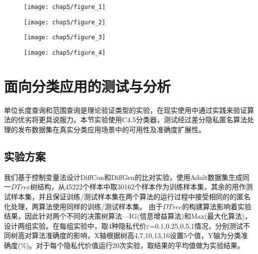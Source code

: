 \begin{figure}[!htp]
	\centering
	\texttt{[image: chap5/figure\_1]}
\end{figure}

\begin{figure}[!htp]
	\centering
	\texttt{[image: chap5/figure\_2]}
\end{figure}

\begin{figure}[!htp]
	\centering
	\texttt{[image: chap5/figure\_3]}
\end{figure}

\begin{figure}[!htp]
	\centering
	\texttt{[image: chap5/figure\_4]}
\end{figure}

\section{面向分类应用的测试与分析}

单位长度查询和范围查询是理论验证类型的实验，在现实使用中通过实践来验证算法的优劣将更具说服力。本节实验使用C4.5分类器，测试经过差分隐私匿名算法处理的发布数据集在真实分类应用场景中的可用性及准确度扩展性。

\subsection{实验方案}

我们基于控制变量法设计DiffCon和DiffGen的比对实验，使用Adult数据集生成同一$DTree$树结构，从45222个样本中取30162个样本作为训练样本集，其余的用作测试样本集，并且保证训练/测试样本集在两个算法的运行过程中接受相同的的匿名化处理，两算法使用同样的训练/测试样本集。
由于$DTree$的构建算法影响着实验结果，因此针对两个不同的决策树算法---IG(信息增益算法)和Max(最大化算法)，设计两组实验。在每组实验中，取4种隐私代价$\varepsilon$=0.1,0.25,0.5,1情况，分别测试不同树高对算法准确度的影响，X轴根据树高4,7,10,13,16设置5个值，Y轴为分类准确度(\%)。对于每个隐私代价值运行20次实验，取结果的平均值做为实验结果。

